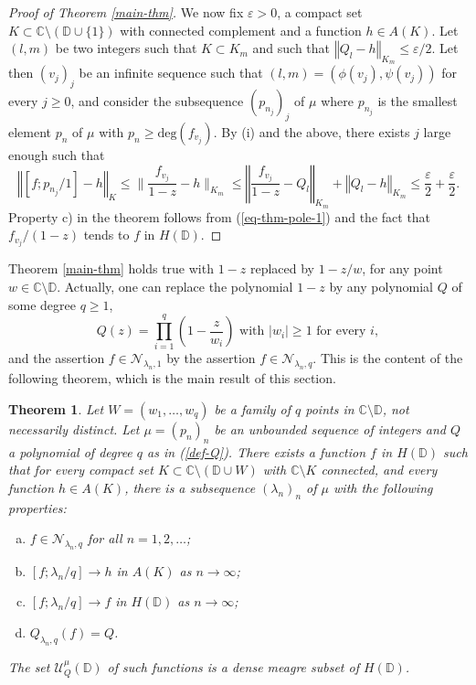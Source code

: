 \documentclass[12pt]{amsart}
\numberwithin{equation}{section}
\newtheorem{theorem}{Theorem}[section]
\begin{document}
\begin{proof}[Proof of Theorem \ref{main-thm}]
We now fix $\varepsilon >0$, a compact set $K\subset {\mathbb{C}}\setminus ({\mathbb D}\cup \{1\})$ with connected complement and a function $h\in A(K)$. Let $(l,m)$ be two integers such that $K\subset K_m$ and such that $\left\Vert Q_l-h\right\Vert _{K_m}\leq \varepsilon /2$. Let then $\left(v_j\right)_j$ be an infinite sequence such that $(l,m)=(\phi(v_j),\psi(v_j))$ for every $j\geq 0$, and consider the subsequence $\left(p_{n_j}\right)_j$ of $\mu$ where $p_{n_j}$ is the smallest element $p_n$ of $\mu$ with $p_{n}\geq \text{deg}\left(f_{v_j}\right)$. By (i) and the above, there exists $j$ large enough such that
$$\left\Vert [f;p_{n_j}/1]-h\right\Vert _K\leq  \bigg\|\frac{f_{v_j}}{1-z}-h\bigg\|_{K_m}\leq  \left\Vert \frac{f_{v_j}}{1-z}-Q_l\right\Vert _{K_m}+ \left\Vert Q_l-h\right\Vert _{K_m}\leq  \frac{\varepsilon }{2}+\frac{\varepsilon }{2}.
$$
Property c) in the theorem follows from (\ref{eq-thm-pole-1}) and the fact that $f_{v_j}/(1-z)$ tends to $f$ in $H({\mathbb D})$.
\end{proof}

Theorem \ref{main-thm} holds true with $1-z$ replaced by $1-z/w$, for any point $w\in {\mathbb{C}} \setminus {\mathbb D}$. Actually, one can replace the polynomial $1-z$ by any polynomial $Q$ of some degree $q\geq 1$,
\begin{equation}\label{def-Q}
Q(z)=\prod _{i=1}^q \left(1-\frac{z}{w_i}\right)\text{ with }|w_i|\geq 1\text{ for every }i,
\end{equation}
and the assertion $f\in {\mathcal N}_{\lambda _n,1}$ by the assertion $f\in {\mathcal N}_{\lambda _n,q}$. This is the content of the following theorem, which is the main result of this section.

\begin{theorem}\label{main-thm-Q}
Let $W=(w_1,\ldots,w_q)$ be a family of $q$ points in ${\mathbb{C}} \setminus {\mathbb D}$, not necessarily distinct. Let $\mu=\left(p_n\right)_n$ be an unbounded sequence of integers and $Q$ a polynomial of degree $q$ as in (\ref{def-Q}).
There exists a function $f$
in $H({\mathbb D})$ such that for every compact set $K\subset {\mathbb{C}} \setminus ({\mathbb D}\cup W)$ with ${\mathbb{C}} \setminus K$ connected, and every function $h\in A(K)$, there is a subsequence $\left(\lambda_n\right)_n$ of $\mu$ with the following properties:
\begin{enumerate}[a)]
\item $f \in {\mathcal N}_{\lambda_n,q}$ for all $n=1,2,\ldots$;
\item $[f;\lambda_n/q]\rightarrow h$ in $A(K)$ as $n\rightarrow \infty$;
\item $[f;\lambda_n/q]\rightarrow f$ in $H({\mathbb D})$ as $n\rightarrow \infty$;
\item $Q_{\lambda_n,q}(f)=Q$.
\end{enumerate}
The set ${\mathcal U}_{Q}^{\mu}({\mathbb D})$ of such functions is a dense meagre subset of $H({\mathbb D})$.
\end{theorem}
\end{document}
